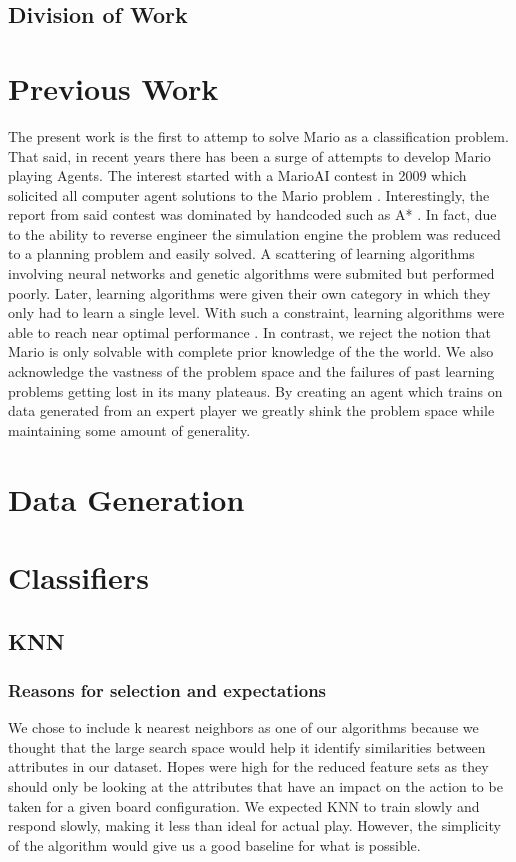 \documentclass[]{article}   %
\begin{document}
\subsection{Division of Work}

\section{Previous Work}
\label{sec:prevwork}
The present work is the first to attemp to solve Mario as a classification problem.  That said, in recent years there has been a surge of attempts to develop Mario playing Agents.  The interest started with a MarioAI contest in 2009 which solicited all computer agent solutions to the Mario problem \cite{2}.  Interestingly, the report from said contest was dominated by handcoded such as A* \cite{3}.  In fact, due to the ability to reverse engineer the simulation engine the problem was reduced to a planning problem and easily solved.  A scattering of learning algorithms involving neural networks and genetic algorithms were submited but performed poorly.  Later, learning algorithms were given their own category in which they only had to learn a single level. With such a constraint, learning algorithms were able to reach near optimal performance \cite{me}. In contrast, we reject the notion that Mario is only solvable with complete prior knowledge of the the world.  We also acknowledge the vastness of the problem space and the failures of past learning problems getting lost in its many plateaus.  By creating an agent which trains on data generated from an expert player we greatly shink the problem space while maintaining some amount of generality.  



\section{Data Generation}     %
\label{sec:datagen}


\section{Classifiers}
\label{sec:class}

\subsection{KNN}
\subsubsection{Reasons for selection and expectations}
We chose to include k nearest neighbors as one of our algorithms because we thought that the large search space would help it identify similarities between attributes in our dataset. Hopes were high for the reduced feature sets as they should only be looking at the attributes that have an impact on the action to be taken for a given board configuration.  We expected KNN to train slowly and respond slowly, making it less than ideal for actual play. However, the simplicity of the algorithm would give us a good baseline for what is possible.
\end{document}
